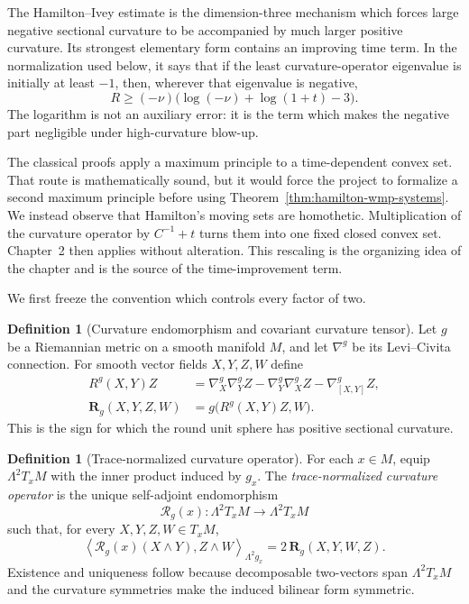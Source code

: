 \documentclass[10pt]{coll-l}
\theoremstyle{definition}
\newtheorem{definition}[theorem]{Definition}
\theoremstyle{remark}
\numberwithin{section}{chapter}
\numberwithin{equation}{chapter}
\begin{document}
The Hamilton--Ivey estimate is the dimension-three mechanism which forces
large negative sectional curvature to be accompanied by much larger
positive curvature.  Its strongest elementary form contains an improving
time term.  In the normalization used below, it says that if the least
curvature-operator eigenvalue is initially at least $-1$, then, wherever
that eigenvalue is negative,
\[
 R\geq(-\nu)\bigl(\log(-\nu)+\log(1+t)-3\bigr).
\]
The logarithm is not an auxiliary error: it is the term which makes the
negative part negligible under high-curvature blow-up.

The classical proofs apply a maximum principle to a time-dependent convex
set.  That route is mathematically sound, but it would force the project to
formalize a second maximum principle before using
Theorem~\ref{thm:hamilton-wmp-systems}.  We instead observe that Hamilton's
moving sets are homothetic.  Multiplication of the curvature operator by
$C^{-1}+t$ turns them into one fixed closed convex set.  Chapter~2 then
applies without alteration.  This rescaling is the organizing idea of the
chapter and is the source of the time-improvement term.

We first freeze the convention which controls every factor of two.

\begin{definition}[Curvature endomorphism and covariant curvature tensor]
\label{def:hi-curvature-tensor}
Let $g$ be a Riemannian metric on a smooth manifold $M$, and let $\nabla^g$
be its Levi--Civita connection.  For smooth vector fields $X,Y,Z,W$ define
\begin{align*}
 R^g(X,Y)Z
   &=\nabla_X^g\nabla_Y^gZ-\nabla_Y^g\nabla_X^gZ
        -\nabla_{[X,Y]}^gZ,\\
 \mathbf R_g(X,Y,Z,W)
   &=g\bigl(R^g(X,Y)Z,W\bigr).
\end{align*}
This is the sign for which the round unit sphere has positive sectional
curvature.
\end{definition}

\begin{definition}[Trace-normalized curvature operator]
\label{def:hi-curvature-operator}
For each $x\in M$, equip $\Lambda^2T_xM$ with the inner product induced by
$g_x$.  The \emph{trace-normalized curvature operator} is the unique
self-adjoint endomorphism
\[
 \mathcal R_g(x):\Lambda^2T_xM\longrightarrow\Lambda^2T_xM
\]
such that, for every $X,Y,Z,W\in T_xM$,
\begin{equation}
 \left\langle\mathcal R_g(x)(X\wedge Y),Z\wedge W\right\rangle_{\Lambda^2g_x}
    =2\,\mathbf R_g(X,Y,W,Z).                              \label{eq:hi-curvature-normalization}
\end{equation}
Existence and uniqueness follow because decomposable two-vectors span
$\Lambda^2T_xM$ and the curvature symmetries make the induced bilinear
form symmetric.
\end{definition}
\end{document}
